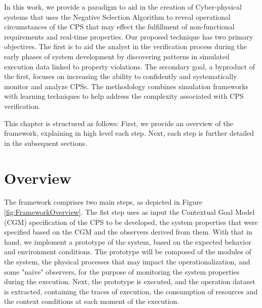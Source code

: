In this work, we provide a paradigm to aid in the creation of Cyber-physical systems that uses the Negative Selection Algorithm to reveal operational circumstances of the CPS that may effect the fulfillment of non-functional requirements and real-time properties. Our proposed technique has two primary objectives. The first is to aid the analyst in the verification process during the early phases of system development by discovering patterns in simulated execution data linked to property violations. The secondary goal, a byproduct of the first, focuses on increasing the ability to confidently and systematically monitor and analyze CPSs. The methodology combines simulation frameworks with learning techniques to help address the complexity associated with CPS verification.


This chapter is structured as follows: First, we provide an overview of the framework, explaining in high level each step. Next, each step is further detailed in the subsequent sections.

\section{Overview}




The framework comprises two main steps, as depicted in Figure \ref{fig:FrameworkOverview}.
The fist step uses as input the Contextual Goal Model (CGM) specification of the CPS to be developed, the system properties that were specified based on the CGM and the observers derived from them. With that in hand, we implement a prototype of the system, based on the expected behavior and environment conditions. The prototype will be composed of the modules of the system, the physical processes that may impact the operationalization, and some "naive" observers, for the purpose of monitoring the system properties during the execution. Next, the prototype is executed, and the operation dataset is extracted, containing the traces of execution, the consumption of resources and the context conditions at each moment of the execution.

